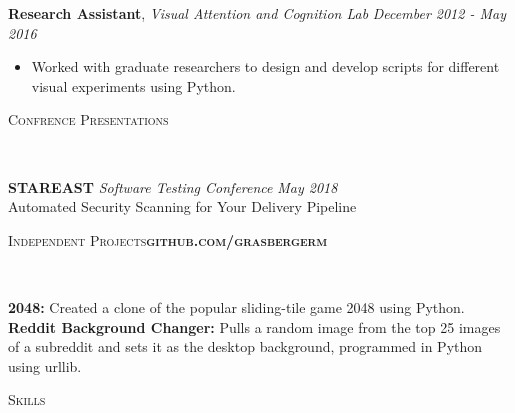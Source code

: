 \documentclass[9pt]{article}
\newenvironment{changemargin}[2]{%
  \begin{list}{}{%
    \setlength{\topsep}{0pt}%
    \setlength{\leftmargin}{#1}%
    \setlength{\rightmargin}{#2}%
    \setlength{\listparindent}{\parindent}%
    \setlength{\itemindent}{\parindent}%
    \setlength{\parsep}{\parskip}%
  }%
  \item[]}{\end{list}
}
\newcommand{\lineover}{
	\begin{changemargin}{-0.05in}{-0.05in}
		\vspace*{-8pt}
		\hrulefill \\
		\vspace*{-2pt}
	\end{changemargin}
}
\newcommand{\header}[1]{
	\begin{changemargin}{-0.5in}{-0.5in}
		\scshape{#1}\\
  	\lineover
	\end{changemargin}
}
\newenvironment{body} {
	\vspace*{-10pt}
	\begin{changemargin}{-0.25in}{-0.5in}
  }	
	{\end{changemargin}
}
\begin{document}
\begin{body}
	\textbf{Research Assistant}, \emph{Visual Attention and Cognition Lab} \hfill \emph{December 2012 - May 2016 }\\
	\vspace*{-4pt}
	\begin{itemize} \itemsep -0pt  %
		\item Worked with graduate researchers to design and develop scripts for different visual experiments using Python.
	\end{itemize}
\end{body}
\vspace{10pt}	
\smallskip
\header{Confrence Presentations}

\begin{body}
	\vspace{14pt}
	\textbf{STAREAST }\emph{Software Testing Conference} \hfill \emph{May 2018}{} \\
	Automated Security Scanning for Your Delivery Pipeline
	\vspace{4pt}
\end{body}
\vspace{10pt}
\smallskip
\header{Independent Projects\hfill \textbf{github.com/grasbergerm}}

\begin{body}
	\vspace{14pt}
	{\textbf{2048:}}{} Created a clone of the popular sliding-tile game 2048 using Python.\\
	\vspace{4pt}
	{\textbf{Reddit Background Changer:}}{} Pulls a random image from the top 25 images of a subreddit and sets it as the desktop background, programmed in Python using urllib.\\
	\vspace{14pt}
\end{body}

\header{Skills}
\end{document}
